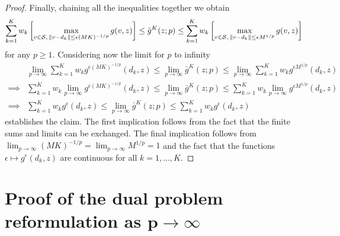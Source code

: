 \begin{proof}
  Finally, chaining all the inequalities together we obtain
  \[
    \sum_{k=1}^K w_k \left[\max_{v\in \mathcal{S},\,\| v-d_k \|\leq \epsilon (MK)^{-1/p}} g(v, z)\right] \leq \bar{g}^K(z;p)  \leq \sum_{k=1}^K w_k \left[\max_{v\in \mathcal{S},\,\| v-d_k \|\leq \epsilon M^{1/p}} g(v, z)\right]
  \]
  for any $p\geq 1$.
  Considering now the limit for $p$ to infinity
  \begin{align*}
    & \lim_{p\to\infty}\sum_{k=1}^K w_k  g^{\epsilon (MK)^{-1/p}}(d_k, z)\leq \lim_{p\to\infty} \bar{g}^K(z;p) \leq \lim_{p\to\infty} \sum_{k=1}^K w_k g^{\epsilon M^{1/p}}(d_k, z) \\
    \implies &\sum_{k=1}^K w_k \lim_{p\to\infty} g^{\epsilon (MK)^{-1/p}}(d_k, z)\leq \lim_{p\to\infty} \bar{g}^K(z;p) \leq \sum_{k=1}^K w_k  \lim_{p\to\infty}  g^{\epsilon M^{1/p}}(d_k, z) \\
    \implies &  \sum_{k=1}^K w_k g^{\epsilon}(d_k, z) \leq \lim_{p\to\infty} \bar{g}^K(z; p) \leq \sum_{k=1}^K w_k g^{\epsilon}(d_k, z)
  \end{align*}
  establishes the claim.
  The first implication follows from the fact that the finite sums and limits can be exchanged. The final implication follows from
  $\lim_{p\to \infty} (MK)^{-1/p} = \lim_{p\to \infty} M^{1/p}=1$ and the fact that the functions $\epsilon \mapsto g^\epsilon(d_k, z)$ are continuous  for all $k=1,\dots, K$.
\end{proof}

\section{Proof of the dual problem reformulation as $\mathbf{p \rightarrow \infty}$}
\label{app:dual_limit}

